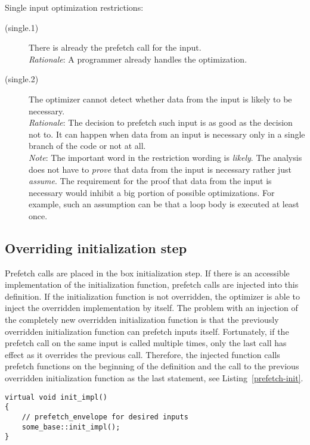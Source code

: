 \pagebreak[4]
Single input optimization restrictions:

\begin{description}
\item[(single.1)]{There is already the prefetch call for the input.\\
\emph{Rationale}: A programmer already handles the optimization.
}

\item[(single.2)]{The optimizer cannot detect whether data from the input is likely to be necessary.\\
\emph{Rationale}: The decision to prefetch such input is as good as the decision not to. It can happen when data from an input is necessary only in a single branch of the code or not at all.\\
\emph{Note}: The important word in the restriction wording is \emph{likely}. The analysis does not have to \emph{prove} that data from the input is necessary rather just \emph{assume}. The requirement for the proof that data from the input is necessary would inhibit a big portion of possible optimizations. For example, such an assumption can be that a loop body is executed at least once.
}
\end{description}

\subsection{Overriding initialization step}
Prefetch calls are placed in the box initialization step. If there is an accessible implementation of the initialization function, prefetch calls are injected into this definition. If the initialization function is not overridden, the optimizer is able to inject the overridden implementation by itself. The problem with an injection of the completely new overridden initialization function is that the previously overridden initialization function can prefetch inputs itself. Fortunately, if the prefetch call on the same input is called multiple times, only the last call has effect as it overrides the previous call. Therefore, the injected function calls prefetch functions on the beginning of the definition and the call to the previous overridden initialization function as the last statement, see Listing~\ref{prefetch-init}.

\begin{lstlisting}[caption={The generated box initialization function definition.}, label={prefetch-init}]
virtual void init_impl()
{
    // prefetch_envelope for desired inputs
    some_base::init_impl();
}
\end{lstlisting}

